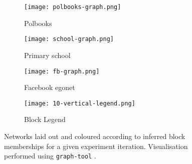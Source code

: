\begin{figure}[!ht]
	\centering
	\begin{subfigure}[t]{0.28\linewidth}
		\centering
		\texttt{[image: polbooks-graph.png]}
		\caption{Polbooks}
		\label{fig:polbooks-graph}
	\end{subfigure}
	\hfill
	\begin{subfigure}[t]{0.28\linewidth}
		\centering
		\texttt{[image: school-graph.png]}
		\caption{Primary school}
		\label{fig:school-graph}
	\end{subfigure}
	\hfill
	\begin{subfigure}[t]{0.28\linewidth}
		\centering
		\texttt{[image: fb-graph.png]}
		\caption{Facebook egonet}
		\label{fig:fb-graph}
	\end{subfigure}
	\begin{subfigure}[t]{0.11\linewidth}
		\centering
		\texttt{[image: 10-vertical-legend.png]}
		\caption{Block Legend}
		\label{fig:10-legend}
	\end{subfigure}
	\caption{Networks laid out and coloured according to inferred block memberships for a given experiment iteration. Visualisation performed using \texttt{graph-tool} \cite{peixoto_graph-tool_2014}.}
	\label{fig:graphs-all}
\end{figure}
%
\begin{table}[!ht]
	\centering
	\caption{Experimental results averaged over $n=10$ iterations (mean $\pm$ std. dev.).}
	\label{tab:results}
\end{table}
%
